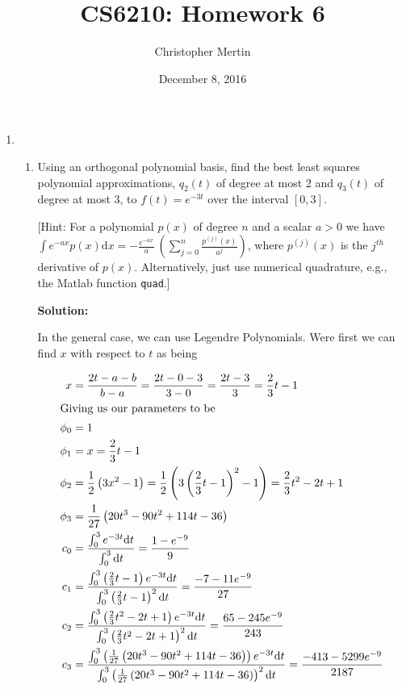 \documentclass[12pt]{article}
\begin{document}
\title{CS6210: Homework 6}
\author{Christopher Mertin}
\date{December 8, 2016}
\maketitle

\begin{enumerate}
\item 

\begin{enumerate}
\item Using an orthogonal polynomial basis, find the best least squares polynomial approximations, $q_{2}(t)$ of degree at most 2 and $q_{3}(t)$ of degree at most 3, to $f(t) = e^{-3t}$ over the interval $[0,3]$.

[Hint: For a polynomial $p(x)$ of degree $n$ and a scalar $a > 0$ we have $\int e^{-ax}p(x)\text{d}x = -\frac{e^{-ax}}{a}\ \left( \sum_{j=0}^{n} \frac{p^{(j)}(x)}{a^{j}}\right)$, where $p^{(j)}(x)$ is the $j^{th}$ derivative of $p(x)$. Alternatively, just use numerical quadrature, e.g., the {\sc Matlab} function {\tt quad}.]

{\bf Solution:}

In the general case, we can use Legendre Polynomials. Were first we can find $x$ with respect to $t$ as being

\begin{align*}
x &= \frac{2t-a-b}{b-a} = \frac{2t-0-3}{3-0} = \frac{2t-3}{3} = \frac{2}{3}t - 1\\
\intertext{Giving us our parameters to be}
\phi_{0} &= 1\\
\phi_{1} &= x = \frac{2}{3}t - 1\\
\phi_{2} &= \frac{1}{2}\left( 3x^{2} - 1\right) = \frac{1}{2}\left( 3 \left(\frac{2}{3}t - 1\right)^{2}-1\right) = \frac{2}{3}t^{2} - 2t + 1\\
\phi_{3} &= \frac{1}{27}\left( 20t^{3} - 90t^{2} + 114t - 36\right)\\
c_{0} &= \frac{\int_{0}^{3}e^{-3t}\text{d}t}{\int_{0}^{3}\text{d}t} = \frac{1 - e^{-9}}{9}\\
c_{1} &= \frac{\int_{0}^{3}\left( \frac{2}{3}t - 1\right) e^{-3t}\text{d}t}{\int_{0}^{3}\left( \frac{2}{3}t - 1\right)^{2}\text{d}t} = \frac{-7 -11e^{-9}}{27}\\
c_{2} &= \frac{\int_{0}^{3}\left( \frac{2}{3}t^{2} - 2t + 1\right)e^{-3t}\text{d}t}{\int_{0}^{3}\left( \frac{2}{3}t^{2} - 2t + 1 \right)^{2}\text{d}t} = \frac{65 - 245 e^{-9}}{243}\\
c_{3} &= \frac{\int_{0}^{3}\left( \frac{1}{27}\left( 20t^{3} - 90t^{2} + 114t - 36\right)\right)e^{-3t}\text{d}t}{\int_{0}^{3}\left( \frac{1}{27}\left( 20t^{3} - 90t^{2} + 114t - 36\right)\right)^{2}\text{d}t} = \frac{-413 - 5299e^{-9}}{2187}
\end{align*}


\end{enumerate}
\end{enumerate}
\end{document}
